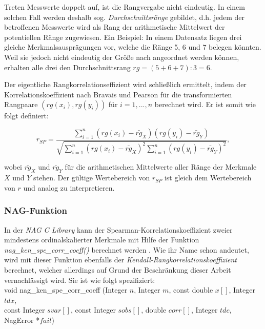 Treten Messwerte doppelt auf, ist die Rangvergabe nicht eindeutig. In einem solchen Fall werden deshalb sog. {\it Durchschnittsränge} gebildet, d.h. jedem der betroffenen Messwerte wird als Rang der arithmetische Mittelwert der potentiellen Ränge zugewiesen. Ein Beispiel: In einem Datensatz liegen drei gleiche Merkmalsausprägungen vor, welche die Ränge 5, 6 und 7 belegen könnten. Weil sie jedoch nicht eindeutig der Größe nach angeordnet werden können, erhalten alle drei den Durchschnittsrang $rg=(5+6+7):3=6$.

Der eigentliche Rangkorrelationseffizient wird schließlich ermittelt, indem der Korrelationskoeffizient nach Bravais und Pearson für die transformierten Rangpaare $(rg(x_i), rg(y_i))$ für $i=1,...,n$ berechnet wird. Er ist somit wie folgt definiert:

\begin{equation*}
    r_{SP}=\dfrac{\sum_{i=1}^{n}{(rg(x_i)-\bar{rg}_X)(rg(y_i)-\bar{rg}_Y)}}{\sqrt{\sum_{i=1}^{n}{(rg(x_i)-\bar{rg}_X)^2\sum_{i=1}^{n}{(rg(y_i)-\bar{rg}_Y)^2}}}},
\end{equation*}

\noindent wobei $\bar{rg}_X$ und $\bar{rg}_Y$ für die arithmetischen Mittelwerte aller Ränge der Merkmale $X$ und $Y$ stehen. Der gültige Wertebereich von $r_{SP}$ ist gleich dem Wertebereich von $r$ und analog zu interpretieren.

\subsubsection{NAG-Funktion}

In der {\it NAG C Library} kann der Spearman-Korrelationskoeffizient zweier mindestens ordinalskalierter Merkmale mit Hilfe der Funktion {\it nag\_ken\_spe\_corr\_coeff()} berechnet werden \cite{nag:g02brc}. Wie ihr Name schon andeutet, wird mit dieser Funktion ebenfalls der {\it Kendall-Rangkorrelationskoeffizient} berechnet, welcher allerdings auf Grund der Beschränkung dieser Arbeit vernachlässigt wird. Sie ist wie folgt spezifiziert:\\

\noindent void nag\_ken\_spe\_corr\_coeff (Integer $n$, Integer $m$, const double $x[]$, Integer $tdx$,\\
\hspace*{5mm} const Integer $svar[]$, const Integer $sobs[]$, double $corr[]$, Integer $tdc$,\\
\hspace*{5mm} NagError *$fail$)\\

